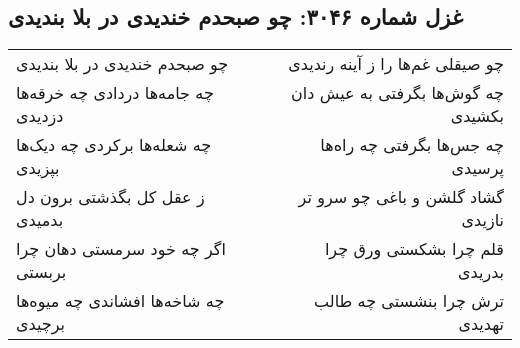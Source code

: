 \begin{center}
\section*{غزل شماره ۳۰۴۶: چو صبحدم خندیدی در بلا بندیدی}
\label{sec:3046}
\begin{longtable}{l p{0.5cm} r}
چو صبحدم خندیدی در بلا بندیدی
&&
چو صیقلی غم‌ها را ز آینه رندیدی
\\
چه جامه‌ها دردادی چه خرقه‌ها دزدیدی
&&
چه گوش‌ها بگرفتی به عیش دان بکشیدی
\\
چه شعله‌ها برکردی چه دیک‌ها بپزیدی
&&
چه جس‌ها بگرفتی چه راه‌ها پرسیدی
\\
ز عقل کل بگذشتی برون دل بدمیدی
&&
گشاد گلشن و باغی چو سرو تر نازیدی
\\
اگر چه خود سرمستی دهان چرا بربستی
&&
قلم چرا بشکستی ورق چرا بدریدی
\\
چه شاخه‌ها افشاندی چه میوه‌ها برچیدی
&&
ترش چرا بنشستی چه طالب تهدیدی
\\
\end{longtable}
\end{center}
